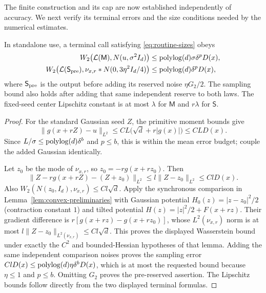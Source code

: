 The finite construction and its cap are now established independently
of accuracy.  We next verify its terminal errors and the size conditions
needed by the numerical estimates.

\begin{lemma}
\label{lem:compiler-terminal}
In standalone use, a terminal call satisfying \eqref{eq:routine-sizes}
obeys
\begin{align*}
 W_2\bigl(\mathcal L(\mathsf M),N(u,\sigma^2I_d)\bigr)
 &\le\operatorname{polylog}(d)\sigma\delta^pD(x),\\
 W_2\bigl(\mathcal L(\mathsf S_{\rm pre}),
          \nu_{x,r}*N(0,3\eta^2I_d/4)\bigr)
 &\le\operatorname{polylog}(d)\delta^pD(x),
\end{align*}
where $\mathsf S_{\rm pre}$ is the output before adding its reserved
noise $\eta G_2/2$.  The sampling bound also holds after adding that
same independent reserve to both laws.  The fixed-seed center
Lipschitz constant is at most $\lambda$ for $\mathsf M$ and
$r\lambda$ for $\mathsf S$.
\end{lemma}
\begin{proof}
For the standard Gaussian seed $Z$, the primitive moment bounds give
\[
 \|g(x+rZ)-u\|_{L^2}
 \le CL\bigl(\sqrt d+r|g(x)|\bigr)\le CLD(x).
\]
Since $L/\sigma\le\operatorname{polylog}(d)\delta^b$ and $p\le b$, this is
within the mean error budget; couple the added Gaussian identically.

Let $z_0$ be the mode of $\nu_{x,r}$, so
$z_0=-rg(x+rz_0)$.  Then
\[
 \|Z-rg(x+rZ)-(Z+z_0)\|_{L^2}
 \le l\|Z-z_0\|_{L^2}\le ClD(x).
\]
Also $W_2(N(z_0,I_d),\nu_{x,r})\le Cl\sqrt d$.
Apply the synchronous comparison in
Lemma~\ref{lem:convex-preliminaries} with Gaussian potential
$H_0(z)=|z-z_0|^2/2$ (contraction constant $1$) and tilted potential
$H(z)=|z|^2/2+F(x+rz)$.  Their gradient difference is
$r[g(x+rz)-g(x+rz_0)]$, whose $L^2(\nu_{x,r})$ norm is at most
$l\|Z-z_0\|_{L^2(\nu_{x,r})}\le Cl\sqrt d$.
This proves the displayed Wasserstein bound under exactly the
$C^2$ and bounded-Hessian hypotheses of that lemma.
Adding the same independent comparison noises proves the sampling
error $ClD(x)\le\operatorname{polylog}(d)\eta\delta^bD(x)$, which is at most
the requested bound because $\eta\le1$ and $p\le b$.  Omitting
$G_2$ proves the pre-reserved assertion.  The Lipschitz bounds follow
directly from the two displayed terminal formulas.
\end{proof}

